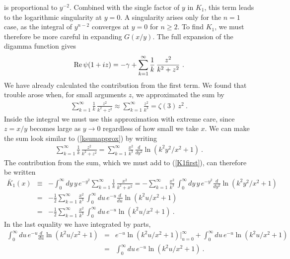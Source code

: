 \documentclass[preprint,12pt,eqsecnum,nofootinbib,amsmath,amssymb]{revtex4}
\begin{document}
is proportional to $y^{-2}$. Combined with the single 
factor of $y$ in $K_1$, this term leads to the logarithmic 
singularity at $y=0$. A singularity arises only for the $n=1$
case, as the integral of $y^{n-2}$ converges at $y=0$ for $n 
\ge 2$. To find $K_1$, we  must therefore be more careful in 
expanding $G(x/y)$. The full expansion of the digamma function
gives 
\begin{eqnarray}
  {\rm Re}\,\psi(1 + i z) = -\gamma + \sum_{k=1}^\infty
  \frac{1}{k}\, \frac{z^2}{k^2 + z^2} \ .
\end{eqnarray}
We have already calculated the contribution from the
first term. We found that trouble arose when, for
small arguments $z$, we approximated  the sum by 
\begin{eqnarray}
\label{ksumapprox}
  \sum_{k=1}^\infty \frac{1}{k}\, 
  \frac{z^2}{k^2 + z^2}  \approx 
  \sum_{k=1}^\infty \frac{z^2}{k^3} = 
  \zeta(3)\, z^2 \ .
\end{eqnarray}
Inside the integral we must use this approximation
with extreme care, since $z=x/y$ becomes large as 
$y \to 0$ regardless of how small we take $x$. We 
can make the sum look similar to (\ref{ksumapprox}) 
by writing 
\begin{eqnarray}
  \sum_{k=1}^\infty
  \frac{1}{k}\, \frac{z^2}{k^2 + z^2} =
  \sum_{k=1}^\infty
  \frac{x^2}{k^3}\,\frac{d}{d y^2} \ln\left(
  k^2 y^2/x^2 + 1 \right) \ .
\end{eqnarray}
The contribution from the sum,  which we must
add to (\ref{K1first}), can therefore be written
\begin{eqnarray}
  \bar K_1(x) 
  &\equiv& 
  -\int_0^\infty \!\!dy\, y \, e^{-y^2}
  \sum_{k=1}^\infty
  \frac{1}{k}\, \frac{x^2}{k^2 + x^2}
  = -\sum_{k=1}^\infty \frac{x^2}{k^3}\,
  \int_0^\infty \!\!dy\,y\,  e^{-y^2} \frac{d}{d y^2} 
  \ln\left(k^2 y^2/x^2 + 1 \right)
\\[8pt]
  &=&
  -\frac{1}{2}\sum_{k=1}^\infty \frac{x^2}{k^3}\,
  \int_0^\infty \!\!du\,  e^{-u} \frac{d}{d u} 
  \ln\left(k^2 u/x^2 + 1 \right)
\\[8pt]
  &=&
  -\frac{1}{2}\sum_{k=1}^\infty \frac{x^2}{k^3}\,
  \int_0^\infty \!\!du\,  e^{-u} 
  \ln\left(k^2 u/x^2 + 1 \right) \ .
\end{eqnarray}
In the last equality we have integrated by parts, 
\begin{eqnarray}
\nonumber
  \int_0^\infty \!\!du\,  e^{-u} \frac{d}{d u} 
  \ln\left(k^2 u/x^2 + 1 \right)
  &=&
  e^{-u} \ln\left(k^2 u/x^2 + 1 \right) 
  \Bigg\vert_{u=0}^\infty +
  \int_0^\infty \!\!du\,  e^{-u} 
  \ln\left(k^2 u/x^2 + 1 \right)
\\[8pt]
  &=&
  \int_0^\infty \!\!du\,  e^{-u} 
  \ln\left(k^2 u/x^2 + 1 \right) \ .
\end{eqnarray}
\end{document}
